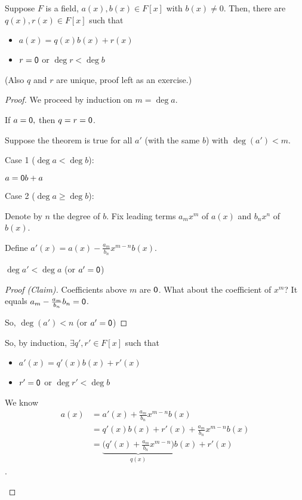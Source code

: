 \documentclass[notes.tex]{subfiles}
\begin{document}
\begin{theorem}
	\label{thm:polydivalg}
	Suppose $F$ is a field, $a(x), b(x)\in F[x]$ with $b(x)\ne 0$. Then, there are $q(x), r(x) \in F[x]$ such that
	\begin{itemize}
		\item $a(x) = q(x)b(x) + r(x)$
		\item $r = \mathsf{0}$ or $\deg r < \deg b$
	\end{itemize}
	(Also $q$ and $r$ are unique, proof left as an exercise.)
\end{theorem}
\begin{proof}
	We proceed by induction on $m = \deg a$.

	If $a=\mathsf{0},$ then $q=r=\mathsf{0}$.

	Suppose the theorem is true for all $a'$ (with the same $b$) with $\deg(a') < m$.

	Case 1 ($\deg a < \deg b$):
	\begin{tabin}
		$a = \mathsf{0} b + a$
	\end{tabin}
	Case 2 ($\deg a \ge \deg b$):
	\begin{tabin}
		Denote by $n$ the degree of $b$.
		Fix leading terms $a_mx^m$ of $a(x)$ and $b_nx^n$ of $b(x)$.

		Define $a'(x) = a(x) - \frac{a_m}{b_n}x^{m-n}b(x)$.

		\begin{claim}
			$\deg a' < \deg a$
			(or $a'=\mathsf{0}$)
		\end{claim}
		\begin{proof}[Proof (Claim)]
			Coefficients above $m$ are $\mathsf{0}$. What about the coefficient of $x^m$? It equals $a_m - \frac{a_m}{b_n}b_n = \mathsf{0}$.

			So, $\deg(a') < n$ (or $a' = \mathsf{0}$)
		\end{proof}
		So, by induction, $\exists q', r'\in F[x]$ such that
		\begin{itemize}
			\item $a'(x) = q'(x)b(x) + r'(x)$
			\item $r'=\mathsf{0}$ or $\deg r' < \deg b$
		\end{itemize}
		We know \begin{align*}
			a(x)&=a'(x) + \frac{a_m}{b_n}x^{m-n}b(x)\\
			&= q'(x)b(x) + r'(x) + \frac{a_m}{b_n}x^{m-n}b(x)\\
			&= \underbrace{\big(q'(x) + \frac{a_m}{b_n}x^{m-n}\big)}_{q(x)}b(x) + r'(x)
		\end{align*}.
	\end{tabin}
\end{proof}
\end{document}
